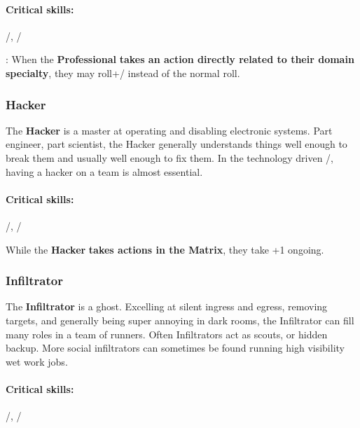 \documentclass[oneside,10pt]{article}
\begin{document}
\begin{multicols}{2}
\paragraph{Critical skills:}
\mastery/, \twitch/

\begin{tcolorbox}[title=Special Move]
  : When the \textbf{Professional}
  \textbf{takes an action directly related to their domain specialty},
  they may roll+\mastery/ instead of the normal roll.
\end{tcolorbox}



\movename{}

\subsubsection{Hacker}

The \textbf{Hacker} is a master at operating and disabling electronic
systems. Part engineer, part scientist, the Hacker generally
understands things well enough to break them and usually well enough to
fix them. In the technology driven \SW/, having a hacker on a team is
almost essential.

\paragraph{Critical skills:}
\mastery/, \flair/

\begin{tcolorbox}[title=Special Move]
   While the \textbf{Hacker} \textbf{takes
    actions in the Matrix}, they take +1 ongoing.
\end{tcolorbox}

\subsubsection{Infiltrator}

The \textbf{Infiltrator} is a ghost. Excelling at silent ingress and
egress, removing targets, and generally being super annoying in dark
rooms, the Infiltrator can fill many roles in a team of runners. Often
Infiltrators act as scouts, or hidden backup. More social infiltrators
can sometimes be found running high visibility wet work jobs.

\paragraph{Critical skills:}
\twitch/, \mastery/


\end{multicols}
\end{document}
